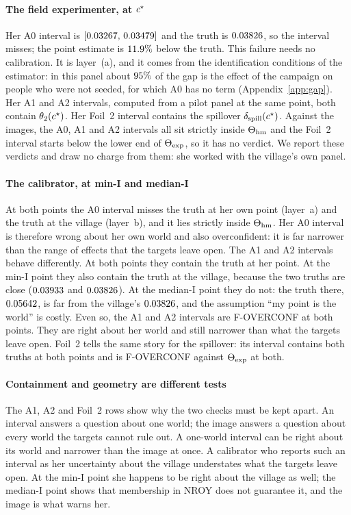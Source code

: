 \paragraph{The field experimenter, at $c^\star$} Her A0 interval is
$[0.03267,\,0.03479]$ and the truth is $0.03826$, so the
interval misses; the point estimate is $11.9\%$ below the truth.
This failure needs no calibration. It is layer~(a), and it comes from the
identification conditions of the estimator: in this panel about
$95\%$ of the gap is the effect of the campaign on
people who were not seeded, for which A0 has no term (Appendix~\ref{app:gap}). Her A1 and A2 intervals, computed from a pilot panel at
the same point, both contain $\theta_2(c^\star)$. Her Foil~2 interval contains the
spillover $\delta_{\mathrm{spill}}(c^\star)$. Against the images, the A0, A1 and A2 intervals all
sit strictly inside $\Theta_{\mathrm{hm}}$ and the Foil~2 interval starts below the lower
end of $\Theta_{\mathrm{exp}}$, so it has no verdict. We report these verdicts and draw
no charge from them: she worked with the village's own panel.

\paragraph{The calibrator, at min-I and median-I} At both points the A0 interval
misses the truth at her own point (layer~a) and the truth at the village
(layer~b), and it lies strictly inside $\Theta_{\mathrm{hm}}$. Her A0 interval is
therefore wrong about her own world and also overconfident: it is far narrower than
the range of effects that the targets leave open. The A1 and A2 intervals behave
differently. At both points they contain the truth at her point. At the min-I
point they also contain the truth at the village, because the two truths are close
($0.03933$ and $0.03826$). At the median-I point they do not: the truth
there, $0.05642$, is far from the village's $0.03826$, and the
assumption ``my point is the world'' is costly. Even so, the A1 and A2 intervals
are F-OVERCONF at both points. They are right about her world and still narrower
than what the targets leave open. Foil~2 tells the same story for the spillover:
its interval contains both truths at both points and is F-OVERCONF against
$\Theta_{\mathrm{exp}}$ at both.

\paragraph{Containment and geometry are different tests} The A1, A2 and Foil~2
rows show why the two checks must be kept apart. An interval answers a question
about one world; the image answers a question about every world the targets cannot
rule out. A one-world interval can be right about its world and narrower than the
image at once. A calibrator who reports such an interval as her uncertainty about
the village understates what the targets leave open. At the min-I point she happens
to be right about the village as well; the median-I point shows that membership in
NROY does not guarantee it, and the image is what warns her.

